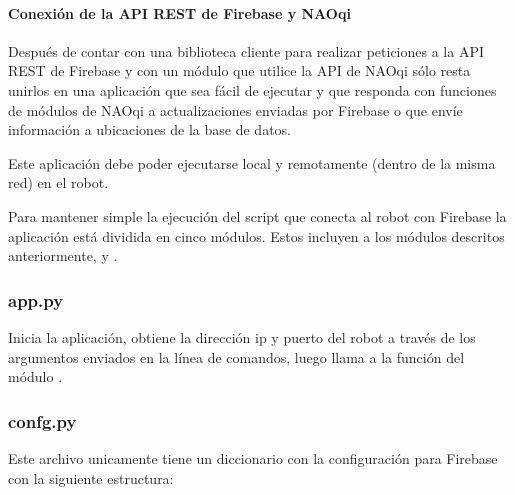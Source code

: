 \paragraph{Conexión de la API REST de Firebase y NAOqi}
\label{\detokenize{nao_firebase:conectando-la-api-rest-de-firebase-y-naoqi}}
Después de contar con una biblioteca cliente para realizar peticiones a la
API REST de Firebase y con un módulo que utilice la API de NAOqi sólo
resta unirlos en una aplicación que sea fácil de ejecutar y que responda con
funciones de módulos de NAOqi a actualizaciones enviadas por Firebase o
que envíe información a ubicaciones de la base de datos.

Este aplicación debe poder ejecutarse local y remotamente (dentro de la misma red)
en el robot.

Para mantener simple la ejecución del script que conecta al robot con Firebase
la aplicación está dividida en cinco módulos. Estos incluyen a los módulos
descritos anteriormente,  y .


\subsubsection{app.py}
\label{\detokenize{nao_firebase:app-py}}\label{\detokenize{nao_firebase:module-app}}

\begin{fulllineitems}
\label{\detokenize{nao_firebase:app.main}}
Inicia la aplicación, obtiene la dirección ip y puerto del robot a través
de los argumentos enviados en la línea de comandos, luego llama a la función
 del módulo .

\end{fulllineitems}



\subsubsection{confg.py}
\label{\detokenize{nao_firebase:confg-py}}
Este archivo unicamente tiene un diccionario con la configuración para Firebase
con la siguiente estructura:

%
\begin{sphinxVerbatim}[commandchars=\\\{\}]
  
     
     
     
\end{sphinxVerbatim}


